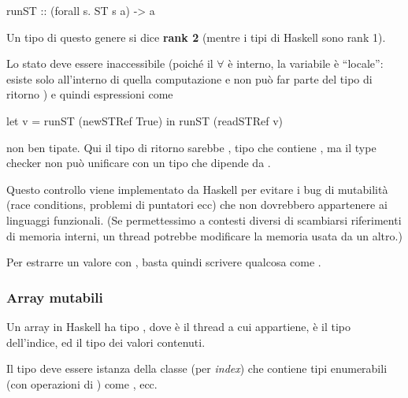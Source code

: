 \begin{haskellbox}{}
runST :: (forall s. ST s a) -> a
\end{haskellbox}

Un tipo di questo genere si dice \textbf{rank 2} (mentre i tipi di Haskell sono rank 1).

Lo stato deve essere inaccessibile (poiché il $\forall$ è interno, la variabile è ``locale'': esiste solo all'interno di quella computazione e non può far parte del tipo di ritorno ) e quindi espressioni come 
\begin{haskellbox}{}
let v = runST (newSTRef True) in runST (readSTRef v)
\end{haskellbox}
non ben tipate. Qui il tipo di ritorno sarebbe , tipo che contiene , ma il type checker non può unificare  con un tipo che dipende da .  

Questo controllo viene implementato da Haskell per evitare i bug di mutabilità (race conditions, problemi di puntatori ecc) che non dovrebbero appartenere ai linguaggi funzionali. (Se permettessimo a contesti diversi di scambiarsi riferimenti di memoria interni, un thread potrebbe modificare la memoria usata da un altro.)

Per estrarre un valore con , basta quindi scrivere qualcosa come .

\subsubsection{Array mutabili}
Un array in Haskell ha tipo , dove  è il thread a cui appartiene,  è il tipo dell'indice, ed  il tipo dei valori contenuti.

Il tipo  deve essere istanza della classe  (per \textit{index}) che contiene tipi enumerabili (con operazioni di ) come ,  ecc.

